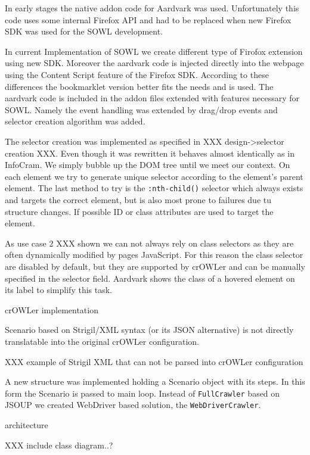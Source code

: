 In early stages the native addon code for Aardvark was used. Unfortunately this
code uses some internal Firefox API and had to be replaced when new Firefox SDK
was used for the SOWL development. 

In current Implementation of SOWL we create different type of Firofox extension
using new SDK. Moreover the aardvark code is injected directly into the webpage
using the Content Script feature of the Firefox SDK. According to these
differences the bookmarklet version better fits the needs and is used. The
aardvark code is included in the addon files extended with features necessary
for SOWL. Namely the event handling was extended by drag/drop events and 
selector creation algorithm was added. 

The selector creation was implemented as specified in XXX design->selector
creation XXX.  Even though it was rewritten it behaves almost identically as in
InfoCram. We simply bubble up the DOM tree until we meet our context. On each
element we try to generate unique selector according to the element's parent
element. The last method to try is the {\tt :nth-child()} selector which always
exists and targets the correct element, but is also most prone to failures due
tu structure changes. If possible ID or class attributes are used to target the
element. 

As use case 2 XXX shown we can not always rely on class selectors as they are 
often dynamically modified by pages JavaScript. For this reason the class
selector are disabled by default, but they are supported by crOWLer and can be
manually specified in the selector field. Aardvark shows the class of a hovered
element on its label to simplify this task. 


\sec crOWLer implementation

Scenario based on Strigil/XML syntax (or its JSON alternative) is not directly 
translatable into the original crOWLer configuration. 

XXX example of Strigil XML that can not be parsed into crOWLer configuration

A new structure was implemented holding a Scenario object with its steps.  In
this form the Scenario is passed to main loop. Instead of {\tt FullCrawler}
based on JSOUP we created WebDriver based solution, the {\tt WebDriverCrawler}. 


\secc architecture

XXX include class diagram..?


%

